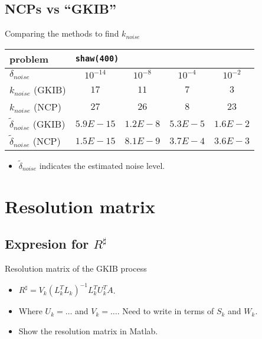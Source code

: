 \documentclass{beamer}
\begin{document}
\subsection{NCPs vs ``GKIB''}
\begin{frame}{Comparing the methods to find $k_{noise}$}
  \begin{center}
    \begin{tabular}{l||c|c|c|c}
      \multicolumn{1}{l||}{problem} & \multicolumn{4}{l}{\texttt{shaw(400)}} \\
      \hline \hline 
      $\delta_{noise}$ & $10^{-14}$ & $10^{-8}$ & $10^{-4}$ & $10^{-2}$ \\
      \hline
      $k_{noise}$ (GKIB) & $17$ & $11$ & $7$ & $3$ \\
      \hline
      $k_{noise}$ (NCP) & $27$ & $26$ & $8$ & $23$ \\
      \hline
      $\tilde{\delta}_{noise}$ (GKIB) & $5.9E-15$ & $1.2E-8$ & $5.3E-5$ &
      $1.6E-2$ \\
      \hline
      $\tilde{\delta}_{noise}$ (NCP) & $1.5E-15$ & $8.1E-9$ & $3.7E-4$ & 
      $3.6E-3$ \\
    \end{tabular}
  \end{center}
  \begin{itemize}
    \item $\tilde{\delta}_{noise}$ indicates the estimated noise level.
    \end{itemize}
\end{frame}

\section{Resolution matrix}
\subsection{Expresion for $R^{\sharp}$}
\begin{frame}{Resolution matrix of the GKIB process}
  \begin{itemize}
    \item $R^{\sharp} = V_{k}(L_{k}^{T}L_{k})^{-1}L_{k}^{T}U_{k}^{T}A$.
    \item Where $U_{k} = \ldots$ and $V_{k} = \ldots$. Need to write in terms of
      $S_{k}$ and $W_{k}$.
    \item Show the resolution matrix in Matlab.
    \end{itemize}
\end{frame}
\end{document}
